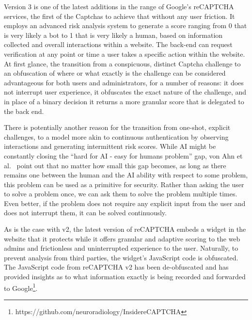 Version 3 is one of the latest additions in the range of Google's reCAPTCHA services, the first of the Captchas to achieve that without any user friction.
It employs an advanced risk analysis system to generate a score ranging from 0 that is very likely a bot to 1 that is very likely a human, based on information collected and overall interactions within a website.
The back-end can request verification at any point or time a user takes a specific action within the website.
At first glance, the transition from a conspicuous, distinct Captcha challenge to an obfuscation of where or what exactly is the challenge can be considered advantageous for both users and administrators, for a number of reasons: it does not interrupt user experience, it obfuscates the exact nature of the challenge, and in place of a binary decision it returns a more granular score that is delegated to the back end.

There is potentially another reason for the transition from one-shot, explicit challenges, to a model more akin to continuous authentication by observing interactions and generating intermittent risk scores.
While \gls{AI} might be constantly closing the ``hard for AI - easy for humans problem'' gap, von Ahn et al.~\cite{von2003captcha} point out that no matter how small this gap becomes, as long as there remains one between the human and the AI ability with respect to some problem, this problem can be used as a primitive for security.
Rather than asking the user to solve a problem once, we can ask them to solve the problem multiple times.
Even better, if the problem does not require any explicit input from the user and does not interrupt them, it can be solved continuously.

As is the case with v2, the latest version of reCAPTCHA embeds a widget in the website that it protects while it offers granular and adaptive scoring to the web admins and frictionless and uninterrupted experience to the user.
Naturally, to prevent analysis from third parties, the widget's JavaScript code is obfuscated.
The JavaScript code from reCAPTCHA v2 has been de-obfuscated and has provided insights as to what information exactly is being recorded and forwarded to Google\footnote{https://github.com/neuroradiology/InsidereCAPTCHA}.


